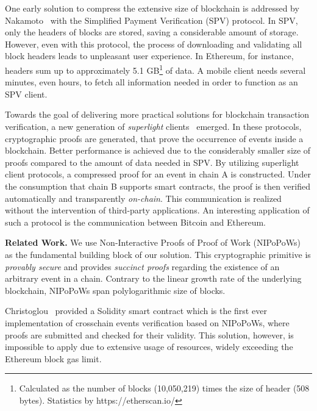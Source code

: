 One early solution to compress the extensive size of blockchain is addressed by
Nakamoto~\cite{nakamoto} with the Simplified Payment Verification (SPV)
protocol. In SPV, only the headers of blocks are stored, saving a
considerable amount of storage.  However, even with this protocol, the process
of downloading and validating all block headers leads to unpleasant user
experience. In Ethereum, for instance, headers sum up to approximately 5.1
GB\footnote{Calculated as the number of blocks (10,050,219) times the size of
header (508 bytes). Statistics by https://etherscan.io/} of data. A mobile
client needs several minutes, even hours, to fetch all information needed in
order to function as an SPV client.

Towards the goal of delivering more practical solutions for blockchain
transaction verification, a new generation of \emph{superlight}
clients~\cite{popow,nipopows,compactsuperblocks, flyclient} emerged. In these
protocols, cryptographic proofs are generated, that prove the occurrence of
events inside a blockchain. Better performance is achieved due to the
considerably smaller size of proofs compared to the amount of data needed in
SPV. By utilizing superlight client protocols, a compressed proof for an event
in chain A is constructed. Under the consumption that chain B supports smart
contracts, the proof is then verified automatically and transparently
\emph{on-chain}. This communication is realized without the intervention of
third-party applications. An interesting application of such a protocol is the
communication between Bitcoin and Ethereum.

\noindent

\textbf{Related Work.} We use Non-Interactive Proofs of Proof of Work
(NIPoPoWs)~\cite{nipopows, pow-sidechains} as the fundamental building block
of our solution. This cryptographic primitive is \emph{provably secure} and
provides \emph{succinct proofs} regarding the existence of an arbitrary event
in a chain. Contrary to the linear growth rate of the underlying blockchain,
NIPoPoWs span polylogarithmic size of blocks.

Christoglou~\cite{gglou} provided a Solidity smart contract which is the first
ever implementation of crosschain events verification based on NIPoPoWs, where
proofs are submitted and checked for their validity. This solution, however, is
impossible to apply due to extensive usage of resources, widely exceeding the
Ethereum block gas limit.

\noindent

